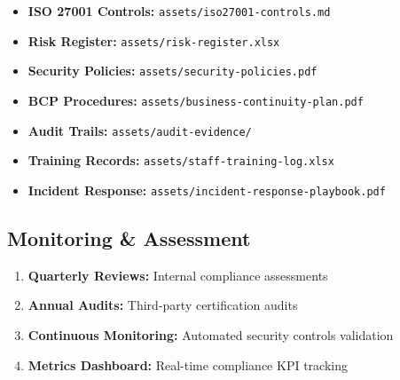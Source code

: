 \begin{itemize}
  \item \textbf{ISO 27001 Controls:} \texttt{assets/iso27001-controls.md}
  \item \textbf{Risk Register:} \texttt{assets/risk-register.xlsx}  
  \item \textbf{Security Policies:} \texttt{assets/security-policies.pdf}
  \item \textbf{BCP Procedures:} \texttt{assets/business-continuity-plan.pdf}
  \item \textbf{Audit Trails:} \texttt{assets/audit-evidence/}
  \item \textbf{Training Records:} \texttt{assets/staff-training-log.xlsx}
  \item \textbf{Incident Response:} \texttt{assets/incident-response-playbook.pdf}
\end{itemize}

\subsection{Monitoring \& Assessment}
\begin{enumerate}
  \item \textbf{Quarterly Reviews:} Internal compliance assessments
  \item \textbf{Annual Audits:} Third-party certification audits
  \item \textbf{Continuous Monitoring:} Automated security controls validation
  \item \textbf{Metrics Dashboard:} Real-time compliance KPI tracking
\end{enumerate}

